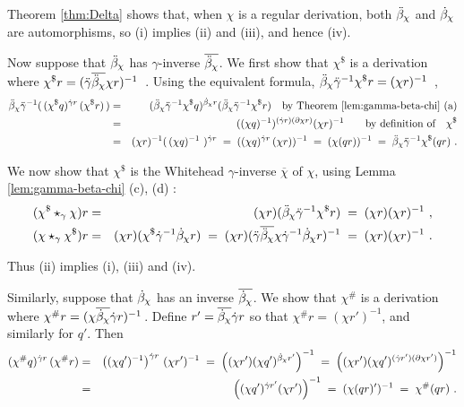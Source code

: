 \begin{pf}
Theorem \ref{thm:Delta} shows that, when $\chi$ is a regular derivation,
both  $\ddot{\beta}_{\chi}$  and  $\dot{\beta}_{\chi}$  are automorphisms, 
so (i) implies (ii) and (iii), and hence (iv).

\medskip
Now suppose that  $\ddot{\beta}_{\chi}$  has $\gamma$-inverse $\overline{\ddot{\beta}_{\chi}}$.
We first show that  $\chi^{\$}$  is a derivation where
$\chi^{\$} r = (\ddot{\gamma} \overline{\ddot{\beta}_{\chi}} \chi r)^{-1}$~.
Using the equivalent formula, 
$\ddot{\beta}_{\chi} \ddot{\gamma}^{-1} \chi^{\$}r = (\chi r)^{-1}$~,
\begin{eqnarray*}
\ddot{\beta}_{\chi} \ddot{\gamma}^{-1}(\,(\chi^{\$} q)^{\dot{\gamma} r} \,(\chi^{\$} r)\,)
  & = &
    (\ddot{\beta}_{\chi} \ddot{\gamma}^{-1} \chi^{\$} q)^{\dot{\beta}_{\chi}r} 
     (\ddot{\beta}_{\chi} \ddot{\gamma}^{-1} \chi^{\$} r)
      \quad \mbox{by Theorem \ref{lem:gamma-beta-chi} (a)} \\
  & = &
    ((\chi q)^{-1})^{(\dot{\gamma} r)(\partial \chi r)} (\chi r)^{-1} 
      \quad\quad \mbox{by definition of} \quad \chi^{\$} \\
  & = &
    (\chi r)^{-1}(\,(\chi q)^{-1}~)^{\dot{\gamma} r} 
  \;=\; 
    ((\chi q)^{\dot{\gamma} r}\,(\chi r))^{-1} 
  \;=\;
    (\chi(qr))^{-1}
  \;=\;
    \ddot{\beta}_{\chi} \ddot{\gamma}^{-1} \chi^{\$}(qr)~.
\end{eqnarray*}

\noindent 
We now show that  $\chi^{\$}$  is the Whitehead $\gamma$-inverse 
$\overline{\chi}$ of  $\chi$, 
using Lemma \ref{lem:gamma-beta-chi} (c), (d) :  
\begin{eqnarray*}
(\chi^{\$} \star_{\gamma} \chi)r 
  & = &  (\chi r)(\ddot{\beta}_{\chi} \ddot{\gamma}^{-1} \chi^{\$} r) 
  \;=\;  (\chi r)(\chi r)^{-1}~, \\ 
(\chi \star_{\gamma} \chi^{\$})r 
  & = &  (\chi r)(\chi^{\$} \dot{\gamma}^{-1} \dot{\beta}_{\chi} r) 
  \;=\;  (\chi r)(\ddot{\gamma} \overline{\ddot{\beta}_{\chi}} \chi \dot{\gamma}^{-1} \dot{\beta}_{\chi} r)^{-1} 
  \;=\;  (\chi r)(\chi r)^{-1}~. 
\end{eqnarray*}

\noindent
Thus (ii) implies (i), (iii) and (iv).

\medskip
Similarly, suppose that  $\dot{\beta}_{\chi}$  has an inverse  $ \overline{\dot{\beta}_{\chi}} $.
We show that  $\chi^{\#}$  is a derivation where
$\chi^{\#} r = (\chi \overline{\dot{\beta}_{\chi}} \dot{\gamma} r)^{-1}$\,.
Define  $r' = \overline{\dot{\beta}_{\chi}} \dot{\gamma} r$  so that  
$\chi^{\#}r = (\chi r')^{-1}$, 
and similarly for  $q'$.  Then
\begin{eqnarray*} 
(\chi^{\#}q)^{\dot{\gamma} r}\, (\chi^{\#} r) 
  & = & 
    \left( (\chi q')^{-1} \right)^{\dot{\gamma} r}\, (\chi r')^{-1} 
  \;=\; 
    \left( (\chi r') (\chi q')^{\dot{\beta}_{\chi} r'} \right)^{-1} 
  \;=\; 
    \left( (\chi r') (\chi q')^{(\dot{\gamma} r')(\partial\chi r')} \right)^{-1} \\ 
  & = & 
    \left( (\chi q')^{\dot{\gamma} r'} (\chi r') \right)^{-1}
  \;=\; 
    (\chi(qr)')^{-1}
  \;=\; 
    \chi^{\#}(qr)~. 
\end{eqnarray*}


\end{pf}
